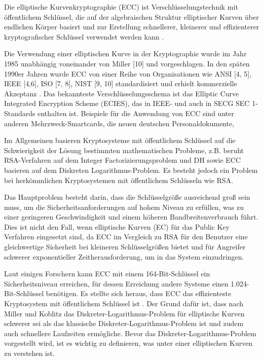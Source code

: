 Die elliptische Kurvenkryptographie (ECC) ist Verschlüsselungstechnik mit öffentlichem Schlüssel, 
die auf der algebraischen Struktur elliptischer Kurven über endlichen Körper basiert \cite{mihNita} und zur Erstellung schnellerer, kleinerer und effizienterer kryptografischer Schlüssel verwendet werden kann \cite{khan}. 

Die Verwendung einer elliptischen Kurve in der Kryptographie wurde im Jahr 1985 unabhängig voneinander von Miller [10] und \cite{koblitz} vorgeschlagen. In den späten 1990er Jahren wurde ECC von einer Reihe von Organisationen wie ANSI [4, 5], IEEE [4,6], ISO [7, 8], NIST [9, 10] standardisiert und erhielt kommerzielle Akzeptanz \cite{GaMoDa}.
Das bekannteste Verschlüsselungsschema ist das Elliptic Curve Integrated Encryption Scheme (ECIES), das in IEEE- und auch in SECG SEC 1-Standards enthalten ist\cite{marKaur}. Beispiele für die Anwendung von ECC sind unter anderen Mehrzweck-Smartcards, die  neuen  deutschen  Personaldokumente\cite{merLo}, 

Im Allgemeinen basieren Kryptosysteme mit öffentlichem Schlüssel auf die Schwierigkeit der Lösung bestimmten mathematischen Probleme, z.B. beruht RSA-Verfahren auf dem Integer Factorizierungsproblem und DH sowie ECC basieren auf dem Diskreten Logarithmus-Problem. Es besteht jedoch ein Problem bei herkömmlichen Kryptosystemen mit öffentlichem Schlüsseln wie RSA. 

Das Hauptproblem besteht darin, dass die Schlüsselgröße ausreichend groß sein muss, um die Sicherheitsanforderungen auf hohem Niveau zu erfüllen, was zu einer geringeren Geschwindigkeit und einem höheren Bandbreitenverbrauch führt. Dies ist nicht den Fall, wenn elliptische Kurven (EC) für das Public Key Verfahren eingesetzt sind, da ECC im Vergleich zu RSA für den Benutzer eine gleichwertige Sicherheit bei kleineren Schlüsselgrößen bietet und für Angreifer schwerer exponentieller Zeitherausforderung, um in das System einzudringen\cite{GaMoDa}.


Laut einigen Forschern kann ECC mit einem 164-Bit-Schlüssel ein Sicherheitsniveau erreichen, für dessen Erreichung andere Systeme einen 1.024-Bit-Schlüssel benötigen\cite{khan}. Es stellte sich heraus, dass ECC das effizienteste Kryptosystem mit öffentlichem Schlüssel ist \cite{naRaj}.
Der Grund dafür ist, dass nach Miller und Koblitz das Diskreter-Logarithmus-Problem für elliptische Kurven schwerer sei als das klassische Diskreter-Logarithmus-Problem ist und zudem auch schnellere Laufzeiten ermögliche. Bevor das Diskreter-Logarithmus-Problem vorgestellt wird, ist es wichtig zu definieren, was unter einer elliptischen Kurven zu verstehen ist. 

